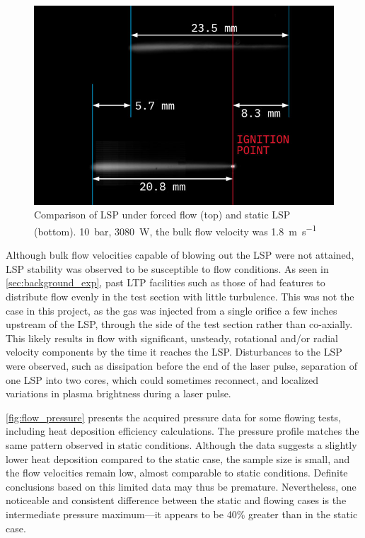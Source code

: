         \begin{figure}[h]
            \centering
            \includegraphics[]{assets/5 results/flow_static_lsp.jpg}
            \caption[Comparison of LSP under forced flow (top) and static LSP (bottom)]{Comparison of LSP under forced flow (top) and static LSP (bottom). \qty{10}{bar}, \qty{3080}{W}, the bulk flow velocity was \qty{1.8}{m.s^{-1}}}
            \label{fig:flow_v_static}
        \end{figure}

        Although bulk flow velocities capable of blowing out the LSP were not attained, LSP stability was observed to be susceptible to flow conditions. As seen in \autoref{sec:background_exp}, past LTP facilities such as those of \textcite{toyodaThrustPerformanceCW2002} had features to distribute flow evenly in the test section with little turbulence. This was not the case in this project, as the gas was injected from a single orifice a few inches upstream of the LSP, through the side of the test section rather than co-axially. This likely results in flow with significant, unsteady, rotational and/or radial velocity components by the time it reaches the LSP. Disturbances to the LSP were observed, such as dissipation before the end of the laser pulse, separation of one LSP into two cores, which could sometimes reconnect, and localized variations in plasma brightness during a laser pulse.

        \autoref{fig:flow_pressure} presents the acquired pressure data for some flowing tests, including heat deposition efficiency calculations. The pressure profile matches the same pattern observed in static conditions. Although the data suggests a slightly lower heat deposition compared to the static case, the sample size is small, and the flow velocities remain low, almost comparable to static conditions. Definite conclusions based on this limited data may thus be premature. Nevertheless, one noticeable and consistent difference between the static and flowing cases is the intermediate pressure maximum---it appears to be 40\% greater than in the static case. 


